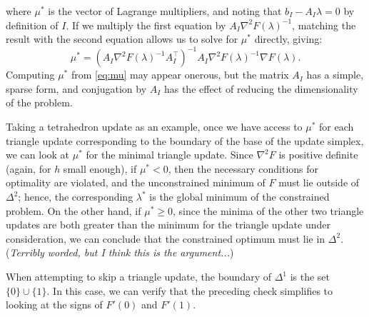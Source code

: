 \documentclass[eikonal.tex]{subfiles}
\begin{document}
where $\mu^*$ is the vector of Lagrange multipliers, and noting that
$b_I - A_I\lambda = 0$ by definition of $I$. If we multiply the first
equation by $A_I \nabla^2 F(\lambda)^{-1}$, matching the result with
the second equation allows us to solve for $\mu^*$ directly, giving:
\begin{equation}\label{eq:mu}
  \mu^* = {(A_I \nabla^2 F(\lambda)^{-1} A_I^\top)}^{-1} A_I \nabla^2 F(\lambda)^{-1} \nabla F(\lambda).
\end{equation}
Computing $\mu^*$ from \cref{eq:mu} may appear onerous, but the matrix
$A_I$ has a simple, sparse form, and conjugation by $A_I$ has the
effect of reducing the dimensionality of the problem.

Taking a tetrahedron update as an example, once we have access to
$\mu^*$ for each triangle update corresponding to the boundary of the
base of the update simplex, we can look at $\mu^*$ for the minimal
triangle update. Since $\nabla^2 F$ is positive definite (again, for
$h$ small enough), if $\mu^* < 0$, then the necessary conditions for
optimality are violated, and the unconstrained minimum of $F$ must lie
outside of $\Delta^2$; hence, the corresponding $\lambda^*$ is the
global minimum of the constrained problem. On the other hand, if
$\mu^* \geq 0$, since the minima of the other two triangle updates are
both greater than the minimum for the triangle update under
consideration, we can conclude that the constrained optimum must lie
in $\Delta^2$. (\emph{Terribly worded, but I think this is the
  argument...})

When attempting to skip a triangle update, the boundary of $\Delta^1$
is the set $\{0\} \cup \{1\}$. In this case, we can verify that the
preceding check simplifies to looking at the signs of $F'(0)$ and
$F'(1)$.
\end{document}
